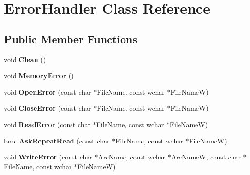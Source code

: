 \hypertarget{class_error_handler}{\section{Error\-Handler Class Reference}
\label{class_error_handler}
}
\subsection*{Public Member Functions}
\begin{DoxyCompactItemize}
\item 
\hypertarget{class_error_handler_aafe35f48d34a8dcda3801a7bef24595d}{void {\bfseries Clean} ()}\label{class_error_handler_aafe35f48d34a8dcda3801a7bef24595d}

\item 
\hypertarget{class_error_handler_ab8a639bac5170654821838d8cb278f2c}{void {\bfseries Memory\-Error} ()}\label{class_error_handler_ab8a639bac5170654821838d8cb278f2c}

\item 
\hypertarget{class_error_handler_a0fcf5384291154219b75d0c21b29fd96}{void {\bfseries Open\-Error} (const char $\ast$File\-Name, const wchar $\ast$File\-Name\-W)}\label{class_error_handler_a0fcf5384291154219b75d0c21b29fd96}

\item 
\hypertarget{class_error_handler_af8e2a28d2dc2532b5a9a28becaf82d9a}{void {\bfseries Close\-Error} (const char $\ast$File\-Name, const wchar $\ast$File\-Name\-W)}\label{class_error_handler_af8e2a28d2dc2532b5a9a28becaf82d9a}

\item 
\hypertarget{class_error_handler_a7009ffd4d1038588dd15d9c1837d530c}{void {\bfseries Read\-Error} (const char $\ast$File\-Name, const wchar $\ast$File\-Name\-W)}\label{class_error_handler_a7009ffd4d1038588dd15d9c1837d530c}

\item 
\hypertarget{class_error_handler_a326e8eddaf1a6d9f0ee0f5c1964f89a6}{bool {\bfseries Ask\-Repeat\-Read} (const char $\ast$File\-Name, const wchar $\ast$File\-Name\-W)}\label{class_error_handler_a326e8eddaf1a6d9f0ee0f5c1964f89a6}

\item 
\hypertarget{class_error_handler_abf5299128386cbaec6bff11ce0d54c31}{void {\bfseries Write\-Error} (const char $\ast$Arc\-Name, const wchar $\ast$Arc\-Name\-W, const char $\ast$File\-Name, const wchar $\ast$File\-Name\-W)}\label{class_error_handler_abf5299128386cbaec6bff11ce0d54c31}


\end{DoxyCompactItemize}
